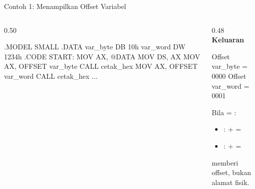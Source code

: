 \documentclass[aspectratio=169,11pt]{beamer}
\begin{document}
\begin{frame}[fragile]{Contoh 1: Menampilkan Offset Variabel}
\begin{columns}[t]
\begin{column}{0.50\textwidth}
\begin{kodeasm}
.MODEL SMALL
.DATA
    var_byte DB 10h
    var_word DW 1234h
.CODE
START:
    MOV AX, @DATA
    MOV DS, AX
    MOV AX, OFFSET var_byte
    CALL cetak_hex
    MOV AX, OFFSET var_word
    CALL cetak_hex
...
\end{kodeasm}
\end{column}
\begin{column}{0.48\textwidth}
\footnotesize
{\color{obeTeal}\bfseries Keluaran}\\[0.15em]
\begin{keluaran}
Offset var_byte = 0000
Offset var_word = 0001
\end{keluaran}

\vspace{0.3em}
Bila  = :
\begin{itemize}
    \item {}:  +  =
    \item {}:  +  =
\end{itemize}

\vspace{0.2em}
{\color{obeGray} memberi offset, bukan alamat fisik.
\par}
\end{column}
\end{columns}
\end{frame}
\end{document}
